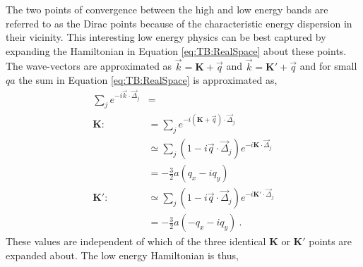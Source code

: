 The two points of convergence between the high and low energy bands are referred to as the Dirac points because of the characteristic energy dispersion in their vicinity.
This interesting low energy physics can be best captured by expanding the Hamiltonian in Equation \ref{eq:TB:RealSpace} about these points.
The wave-vectors are approximated as $\vec{k}=\bm{K}+\vec{q}$ and $\vec{k}=\bm{K'}+\vec{q}$ and for small $qa$ the sum in Equation \ref{eq:TB:RealSpace} is approximated as,
\begin{align}
	\sum_{j} e^{-i \vec{k} \cdot \vec{\Delta}_j}&= \nonumber \\
	\bm{K:}\ 	&=\sum_{j} e^{-i (\bm{K}+\vec{q}) \cdot \vec{\Delta}_j} \nonumber \\
				&\simeq \sum_{j} (1-i \vec{q} \cdot \vec{\Delta}_j) e^{-i \bm{K} \cdot \vec{\Delta}_j} \nonumber \\
				&=-\frac{3}{2} a \left( q_x-i q_y \right) \nonumber \\
	\bm{K':}\	&\simeq \sum_{j} (1-i \vec{q} \cdot \vec{\Delta}_j) e^{-i \bm{K'} \cdot \vec{\Delta}_j} \nonumber \\
				&=-\frac{3}{2} a \left(-q_x-i q_y \right) \ . \label{eq:TB:LowEnergy} 
\end{align}
These values are independent of which of the three identical $\bm{K}$ or $\bm{K'}$ points are expanded about.
The low energy Hamiltonian is thus,
